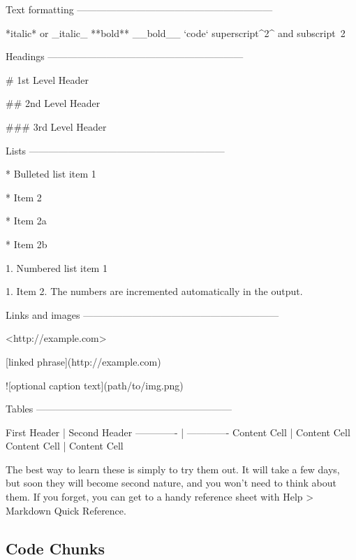 \documentclass[]{book}
\newenvironment{Shaded}{\begin{snugshade}}{\end{snugshade}}
\newcommand{\BaseNTok}[1]{\textcolor[rgb]{0.00,0.00,0.81}{#1}}
\newcommand{\FloatTok}[1]{\textcolor[rgb]{0.00,0.00,0.81}{#1}}
\newcommand{\OtherTok}[1]{\textcolor[rgb]{0.56,0.35,0.01}{#1}}
\newcommand{\FunctionTok}[1]{\textcolor[rgb]{0.00,0.00,0.00}{#1}}
\newcommand{\AlertTok}[1]{\textcolor[rgb]{0.94,0.16,0.16}{#1}}
\newcommand{\NormalTok}[1]{#1}
\begin{document}
\begin{Shaded}
\begin{Highlighting}[]
\NormalTok{Text formatting }
\NormalTok{------------------------------------------------------------}

\NormalTok{*italic*  or _italic_}
\NormalTok{**bold**   __bold__}
\BaseNTok{`code`}
\NormalTok{superscript^2^ and subscript~2~}

\NormalTok{Headings}
\NormalTok{------------------------------------------------------------}

\FunctionTok{# 1st Level Header}

\FunctionTok{## 2nd Level Header}

\FunctionTok{### 3rd Level Header}

\NormalTok{Lists}
\NormalTok{------------------------------------------------------------}

\NormalTok{* }\FloatTok{  Bulleted list item 1}

\NormalTok{* }\FloatTok{  Item 2}

\BaseNTok{    * Item 2a}

\BaseNTok{    * Item 2b}

\NormalTok{1. }\FloatTok{ Numbered list item 1}

\NormalTok{1. }\FloatTok{ Item 2. The numbers are incremented automatically in the output.}

\NormalTok{Links and images}
\NormalTok{------------------------------------------------------------}

\OtherTok{<http://example.com>}

\OtherTok{[linked phrase](http://example.com)}

\AlertTok{![optional caption text](path/to/img.png)}

\NormalTok{Tables }
\NormalTok{------------------------------------------------------------}

\NormalTok{First Header  | Second Header}
\NormalTok{------------- | -------------}
\NormalTok{Content Cell  | Content Cell}
\NormalTok{Content Cell  | Content Cell}
\end{Highlighting}
\end{Shaded}

The best way to learn these is simply to try them out. It will take a
few days, but soon they will become second nature, and you won't need to
think about them. If you forget, you can get to a handy reference sheet
with Help \textgreater{} Markdown Quick Reference.

\subsection{Code Chunks}\label{code-chunks}
\end{document}
